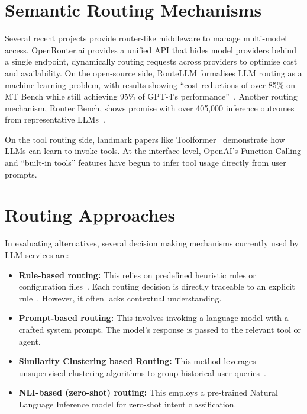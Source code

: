 \section{Semantic Routing Mechanisms}
Several recent projects provide router-like middleware to manage multi-model access. OpenRouter.ai provides a unified API that hides model providers behind a single endpoint, dynamically routing requests across providers to optimise cost and availability. On the open-source side, RouteLLM formalises LLM routing as a machine learning problem, with results showing ``cost reductions of over 85\% on MT Bench while still achieving 95\% of GPT-4's performance''~\citep{routellm2024}. Another routing mechanism, Router Bench, shows promise with over 405,000 inference outcomes from representative LLMs~\citep{routerbench2024}.

On the tool routing side, landmark papers like Toolformer~\citep{toolformer2023} demonstrate how LLMs can learn to invoke tools. At the interface level, OpenAI's Function Calling and ``built-in tools'' features have begun to infer tool usage directly from user prompts.

\section{Routing Approaches}
In evaluating alternatives, several decision making mechanisms currently used by LLM services are:

\begin{itemize}
    \item \textbf{Rule-based routing:} This relies on predefined heuristic rules or configuration files~\citep{liveperson2024}. Each routing decision is directly traceable to an explicit rule~\citep{aws_routing2024}. However, it often lacks contextual understanding.
    
    \item \textbf{Prompt-based routing:} This involves invoking a language model with a crafted system prompt. The model's response is passed to the relevant tool or agent.
    
    \item \textbf{Similarity Clustering based Routing:} This method leverages unsupervised clustering algorithms to group historical user queries~\citep{clustering2024}.
    
    \item \textbf{NLI-based (zero-shot) routing:} This employs a pre-trained Natural Language Inference model for zero-shot intent classification.
\end{itemize}

